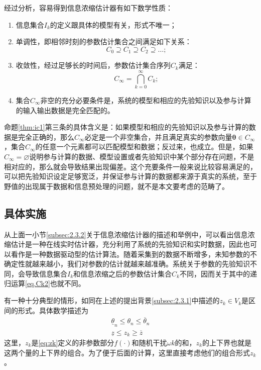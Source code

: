 \begin{prop}%
\label{thm:ic1}
经过分析，容易得到信息浓缩估计器有如下数学性质：
\begin{enumerate}
\item 信息集合$I_{k}$的定义跟具体的模型有关，形式不唯一；
\item 单调性，即相邻时刻的参数估计集合之间满足如下关系：
\begin{equation}%
C_{0}\supseteq C_{1}\supseteq C_{2}\supseteq\ldots;
\end{equation}
\item 收敛性，经过足够长的时间后，参数估计集合序列$C_{k}$满足：
\begin{equation}%
C_{\infty} = \bigcap_{k=0}^{\infty}C_{k};
\end{equation}
\item 集合$C_{\infty}$非空的充分必要条件是，系统的模型和相应的先验知识以及参与计算的输入输出数据是完全匹配的。
\end{enumerate}
\end{prop}

命题\ref{thm:ic1}第三条的具体含义是：如果模型和相应的先验知识以及参与计算的数据是完全正确的，那么$C_{\infty}$必定是一个非空集合，并且满足真实的参数向量$\bm{\theta}\in C_{\infty}$，集合$C_{\infty}$的任意一个元素都可以匹配模型和数据；反过来，也成立。但是，如果$C_{\infty}=\varnothing$说明参与计算的数据、模型设置或者先验知识中某个部分存在问题，不是相对应的，那么就会导致结果出现偏差。这个充要条件一般来说比较容易满足的，可以把先验知识设定足够宽泛，并保证参与计算的数据都来源于真实的系统，至于野值的出现属于数据和信息预处理的问题，就不是本文要考虑的范畴了。
\subsection{具体实施}
\label{subsec:2.3.3}
从上面一小节\ref{subsec:2.3.2}关于信息浓缩估计器的描述和举例中，可以看出信息浓缩估计是一种在线实时估计器，充分利用了系统的先验知识和实时数据，因此也可以看作是一种数据驱动型的估计算法。随着采集到的数据不断增多，未知参数的不确定性就越来越小，我们对参数的估计就越来越准确。系统关于参数的先验知识不同，会导致信息集合$I_{k}$和信息浓缩之后的参数估计集合$C_{k}$不同，因而关于其中的递归运算\eqref{eq.Ck2}也就不同。

有一种十分典型的情形，如同在上述的提出背景\ref{subsec:2.3.1}中描述的$z_{k}\in V_{k}$是区间的形式。具体数学描述为
\begin{eqnarray}%
\underline{\theta}_{n}\leq\theta_{n}\leq\overline{\theta}_{n}\\
\underline{z}\leq z_{k}\geq\overline{z}
\end{eqnarray}
这里，$z_{k}$是\eqref{eq:zk}定义的非参数部分$f(\cdot)$和随机干扰$\omega{k}$的和，$z_{k}$的上下界也就是这两个量的上下界的组合。为了便于后面的计算，这里直接考虑他们的组合形式$z_{k}$。

